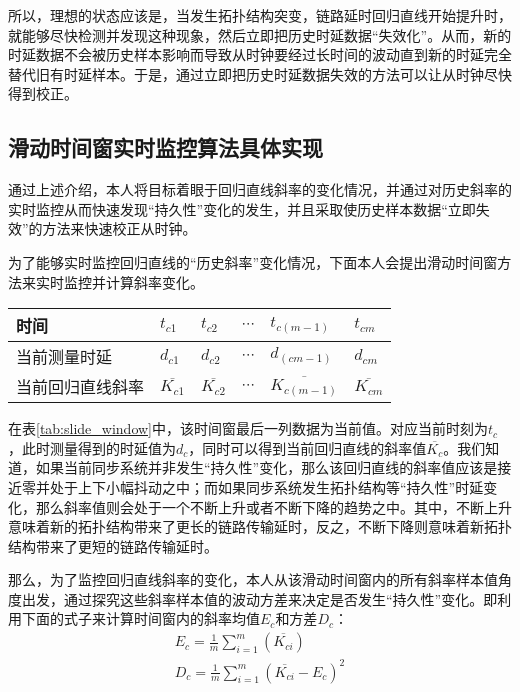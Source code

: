 所以，理想的状态应该是，当发生拓扑结构突变，链路延时回归直线开始提升时，就能够尽快检测并发现这种现象，然后立即把历史时延数据“失效化”。从而，新的时延数据不会被历史样本影响而导致从时钟要经过长时间的波动直到新的时延完全替代旧有时延样本。于是，通过立即把历史时延数据失效的方法可以让从时钟尽快得到校正。

\subsection{滑动时间窗实时监控算法具体实现}
通过上述介绍，本人将目标着眼于回归直线斜率的变化情况，并通过对历史斜率的实时监控从而快速发现“持久性”变化的发生，并且采取使历史样本数据“立即失效”的方法来快速校正从时钟。

为了能够实时监控回归直线的“历史斜率”变化情况，下面本人会提出滑动时间窗方法来实时监控并计算斜率变化。
\begin{table}[!hpb]
  \centering
  \begin{tabular}{llllll} \toprule
  	时间 & $t_{c1}$ & $t_{c2}$ & $\cdots$ & $t_{c(m-1)}$ & $t_{cm}$ \\ \midrule
    当前测量时延 & $d_{c1}$ & $d_{c2}$ & $\cdots$ & $d_{(cm-1)}$ & $d_{cm}$ \\ \midrule
    当前回归直线斜率 & $\overline{K_{c1}}$ & $\overline{K_{c2}}$ & $\cdots$ & $\overline{K_{c(m-1)}}$ & $\overline{K_{cm}}$  \\ \bottomrule
  \end{tabular}
\end{table}

在表\ref{tab:slide_window}中，该时间窗最后一列数据为当前值。对应当前时刻为$t_{c}$，此时测量得到的时延值为$d_{c}$，同时可以得到当前回归直线的斜率值$\overline{K_{c}}$。我们知道，如果当前同步系统并非发生“持久性”变化，那么该回归直线的斜率值应该是接近零并处于上下小幅抖动之中；而如果同步系统发生拓扑结构等“持久性”时延变化，那么斜率值则会处于一个不断上升或者不断下降的趋势之中。其中，不断上升意味着新的拓扑结构带来了更长的链路传输延时，反之，不断下降则意味着新拓扑结构带来了更短的链路传输延时。

那么，为了监控回归直线斜率的变化，本人从该滑动时间窗内的所有斜率样本值角度出发，通过探究这些斜率样本值的波动方差来决定是否发生“持久性”变化。即利用下面的式子来计算时间窗内的斜率均值$E_{c}$和方差$D_{c}$：
\begin{align}
E_{c} = \frac{1}{m}\sum_{i=1}^{m}(\overline{K_{ci}}) \\
D_{c} = \frac{1}{m}\sum_{i=1}^{m}(\overline{K_{ci}} - E_{c}) ^ {2}
\end{align}

